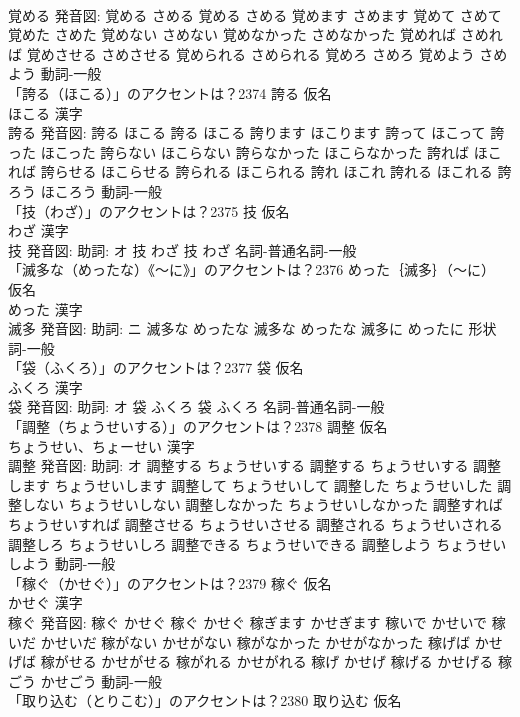 \documentclass[8pt]{extreport}
\begin{document}
\begin{CJK}{UTF8}{min}
\\	覚める 発音図:	覚める さめる		覚める さめる 覚めます さめます 覚めて さめて 覚めた さめた 覚めない さめない 覚めなかった さめなかった 覚めれば さめれば 覚めさせる さめさせる 覚められる さめられる 覚めろ さめろ 覚めよう さめよう				動詞-一般 
\\	「誇る（ほこる）」のアクセントは？2374	誇る 仮名　
\\	ほこる 漢字　
\\	誇る 発音図:	誇る ほこる		誇る ほこる 誇ります ほこります 誇って ほこって 誇った ほこった 誇らない ほこらない 誇らなかった ほこらなかった 誇れば ほこれば 誇らせる ほこらせる 誇られる ほこられる 誇れ ほこれ 誇れる ほこれる 誇ろう ほころう				動詞-一般 
\\	「技（わざ）」のアクセントは？2375	技 仮名　
\\	わざ 漢字　
\\	技 発音図: 助詞: オ	技 わざ		技 わざ				名詞-普通名詞-一般 
\\	「滅多な（めったな）《〜に》」のアクセントは？2376	めった｛滅多｝（〜に） 仮名　
\\	めった 漢字　
\\	滅多 発音図: 助詞: ニ	滅多な めったな		滅多な めったな 滅多に めったに				形状詞-一般 
\\	「袋（ふくろ）」のアクセントは？2377	袋 仮名　
\\	ふくろ 漢字　
\\	袋 発音図: 助詞: オ	袋 ふくろ		袋 ふくろ				名詞-普通名詞-一般 
\\	「調整（ちょうせいする）」のアクセントは？2378	調整 仮名　
\\	ちょうせい、ちょーせい 漢字　
\\	調整 発音図: 助詞: オ	調整する ちょうせいする		調整する ちょうせいする 調整します ちょうせいします 調整して ちょうせいして 調整した ちょうせいした 調整しない ちょうせいしない 調整しなかった ちょうせいしなかった 調整すれば ちょうせいすれば 調整させる ちょうせいさせる 調整される ちょうせいされる 調整しろ ちょうせいしろ 調整できる ちょうせいできる 調整しよう ちょうせいしよう				動詞-一般 
\\	「稼ぐ（かせぐ）」のアクセントは？2379	稼ぐ 仮名　
\\	かせぐ 漢字　
\\	稼ぐ 発音図:	稼ぐ かせぐ		稼ぐ かせぐ 稼ぎます かせぎます 稼いで かせいで 稼いだ かせいだ 稼がない かせがない 稼がなかった かせがなかった 稼げば かせげば 稼がせる かせがせる 稼がれる かせがれる 稼げ かせげ 稼げる かせげる 稼ごう かせごう				動詞-一般 
\\	「取り込む（とりこむ）」のアクセントは？2380	取り込む 仮名　

\end{CJK}
\end{document}
